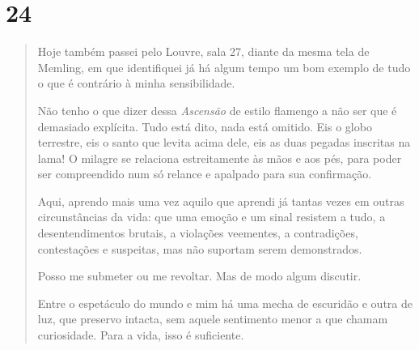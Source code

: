 \section{24}\label{section-23}

\begin{quote}
Hoje também passei pelo Louvre, sala 27, diante da mesma tela de
Memling, em que identifiquei já há algum tempo um bom exemplo de tudo o
que é contrário à minha sensibilidade.

Não tenho o que dizer dessa \emph{Ascensão} de estilo flamengo a não ser
que é demasiado explícita. Tudo está dito, nada está omitido. Eis o
globo terrestre, eis o santo que levita acima dele, eis as duas pegadas
inscritas na lama! O milagre se relaciona estreitamente às mãos e aos
pés, para poder ser compreendido num só relance e apalpado para sua
confirmação.

Aqui, aprendo mais uma vez aquilo que aprendi já tantas vezes em outras
circunstâncias da vida: que uma emoção e um sinal resistem a tudo, a
desentendimentos brutais, a violações veementes, a contradições,
contestações e suspeitas, mas não suportam serem demonstrados.

Posso me submeter ou me revoltar. Mas de modo algum discutir.

Entre o espetáculo do mundo e mim há uma mecha de escuridão e outra de
luz, que preservo intacta, sem aquele sentimento menor a que chamam
curiosidade. Para a vida, isso é suficiente.
\end{quote}
